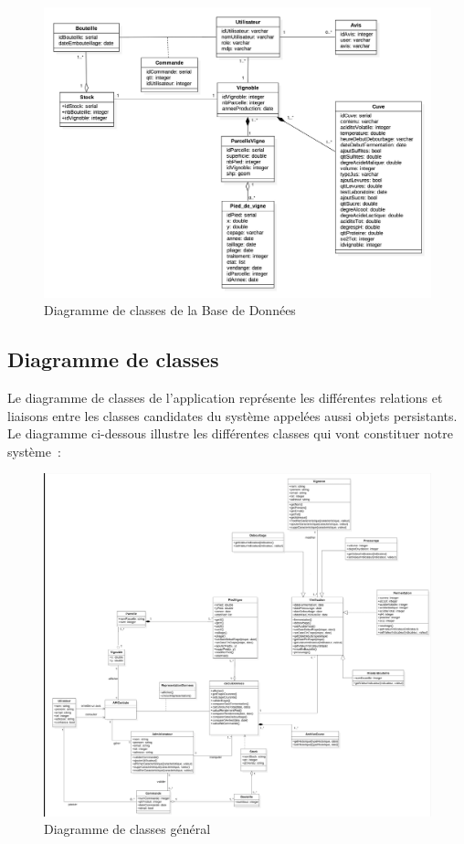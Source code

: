 \documentclass[a4paper, titlepage]{report}
\begin{document}
\clearpage
\begin{figure}[!ht]
\centering
\includegraphics{Images/DiagrammeClasseBDD.jpg}
\caption{Diagramme de classes de la Base de Données}
\end{figure}

\clearpage
\subsection{Diagramme de classes}

Le diagramme de classes de l'application représente les différentes
relations et liaisons entre les classes candidates du système appelées
aussi objets persistants. Le diagramme ci-dessous illustre les
différentes classes qui vont constituer notre système~:

\begin{figure}[!ht]
\centering
\includegraphics{Images/DiagrammeClasse.png}
\caption{Diagramme de classes général}
\end{figure}
\end{document}
